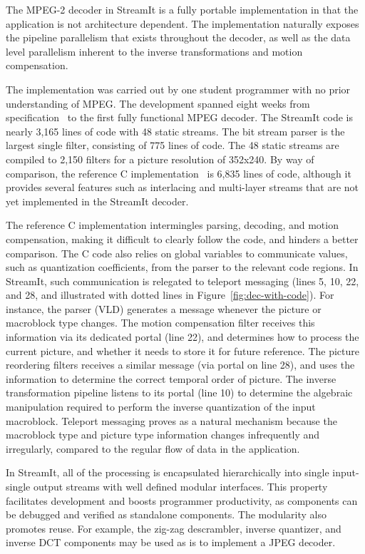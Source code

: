 The MPEG-2 decoder in StreamIt is a fully portable implementation in
that the application is not architecture dependent. The implementation
naturally exposes the pipeline parallelism that exists throughout the
decoder, as well as the data level parallelism inherent to the inverse
transformations and motion compensation.

The implementation was carried out by one student programmer with no
prior understanding of MPEG. The development spanned eight weeks from
specification~\cite{MPEG2} to the first fully functional MPEG
decoder. The StreamIt code is nearly 3,165 lines of code with 48
static streams. The bit stream parser is the largest single filter,
consisting of 775 lines of code. The 48 static streams are compiled to
2,150 filters for a picture resolution of 352x240. By way of
comparison, the reference C implementation~\cite{reference-mpeg-c} is
6,835 lines of code, although it provides several features such as
interlacing and multi-layer streams that are not yet implemented in
the StreamIt decoder.

The reference C implementation intermingles parsing, decoding, and
motion compensation, making it difficult to clearly follow the code,
and hinders a better comparison. The C code also relies on global
variables to communicate values, such as quantization coefficients,
from the parser to the relevant code regions. In StreamIt, such
communication is relegated to teleport messaging (lines 5, 10, 22, and
28, and illustrated with dotted lines in
Figure~\ref{fig:dec-with-code}). For instance, the parser (VLD)
generates a message whenever the picture or macroblock type
changes. The motion compensation filter receives this information via
its dedicated portal (line 22), and determines how to process the
current picture, and whether it needs to store it for future
reference. The picture reordering filters receives a similar message
(via portal on line 28), and uses the information to determine the
correct temporal order of picture. The inverse transformation pipeline
listens to its portal (line 10) to determine the algebraic
manipulation required to perform the inverse quantization of the input
macroblock. Teleport messaging proves as a natural mechanism because
the macroblock type and picture type information changes infrequently
and irregularly, compared to the regular flow of data in the
application.

In StreamIt, all of the processing is encapsulated hierarchically into
single input-single output streams with well defined modular
interfaces. This property facilitates development and boosts
programmer productivity, as components can be debugged and verified as
standalone components. The modularity also promotes reuse. For
example, the zig-zag descrambler, inverse quantizer, and inverse DCT
components may be used as is to implement a JPEG decoder.

